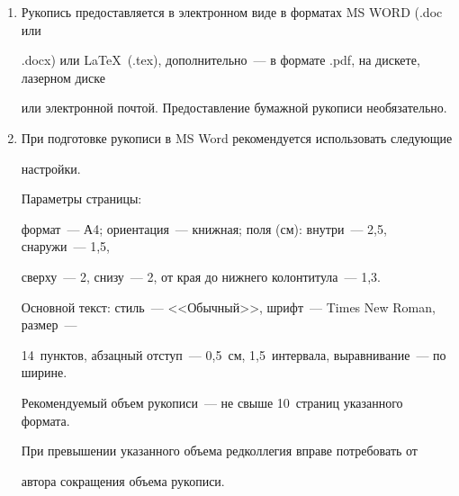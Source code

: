 {\begin{enumerate}[1.]
\item Рукопись предоставляется в электронном виде в форматах MS WORD (.doc или


.docx) или \LaTeX\  (.tex), дополнительно~--- в формате .pdf, на дискете, лазерном диске


или электронной почтой. Предоставление бумажной рукописи необязательно.\\[-13.5pt]





\item При подготовке рукописи в MS Word рекомендуется использовать следующие


настройки.





Параметры страницы:


формат~--- А4; ориентация~--- книжная; поля (см): внутри~--- 2,5, снаружи~--- 1,5,


сверху~--- 2, снизу~--- 2, от края до нижнего колонтитула~--- 1,3.





Основной текст: стиль~--- <<Обычный>>, шрифт~--- Times New Roman, размер~---


14~пунк\-тов, абзацный отступ~--- 0,5~см, 1,5~интервала, выравнивание~--- по ширине.





\pagebreak





\def\leftkol{Правила подготовки рукописей  для публикации в журнале


<<Информатика и её применения>>}





\def\rightkol{Правила подготовки рукописей  для публикации в журнале


<<Информатика и её применения>>}











Рекомендуемый объем рукописи~--- не свыше 10~страниц указанного формата.


При превышении указанного объема редколлегия вправе потребовать от 


автора сокращения объема рукописи.









\end{enumerate}}
